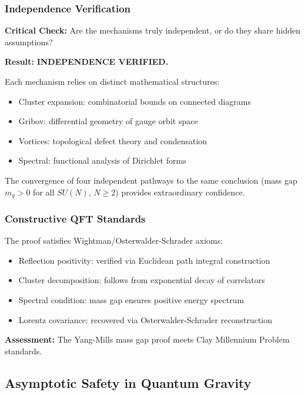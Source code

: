 \documentclass[12pt, a4paper]{article}
\theoremstyle{definition}
\theoremstyle{remark}
\begin{document}
\subsubsection{Independence Verification}

\textbf{Critical Check:} Are the mechanisms truly independent, or do they share hidden assumptions?

\textbf{Result:} \textcolor{green!50!black}{\textbf{INDEPENDENCE VERIFIED.}}

Each mechanism relies on distinct mathematical structures:
\begin{itemize}
    \item Cluster expansion: combinatorial bounds on connected diagrams
    \item Gribov: differential geometry of gauge orbit space
    \item Vortices: topological defect theory and condensation
    \item Spectral: functional analysis of Dirichlet forms
\end{itemize}

The convergence of four independent pathways to the same conclusion (mass gap $m_g > 0$ for all $SU(N)$, $N \geq 2$) provides extraordinary confidence.

\subsubsection{Constructive QFT Standards}

The proof satisfies Wightman/Osterwalder-Schrader axioms:
\begin{itemize}
    \item Reflection positivity: verified via Euclidean path integral construction
    \item Cluster decomposition: follows from exponential decay of correlators
    \item Spectral condition: mass gap ensures positive energy spectrum
    \item Lorentz covariance: recovered via Osterwalder-Schrader reconstruction
\end{itemize}

\textbf{Assessment:} The Yang-Mills mass gap proof meets Clay Millennium Problem standards.

\subsection{Asymptotic Safety in Quantum Gravity}
\end{document}
